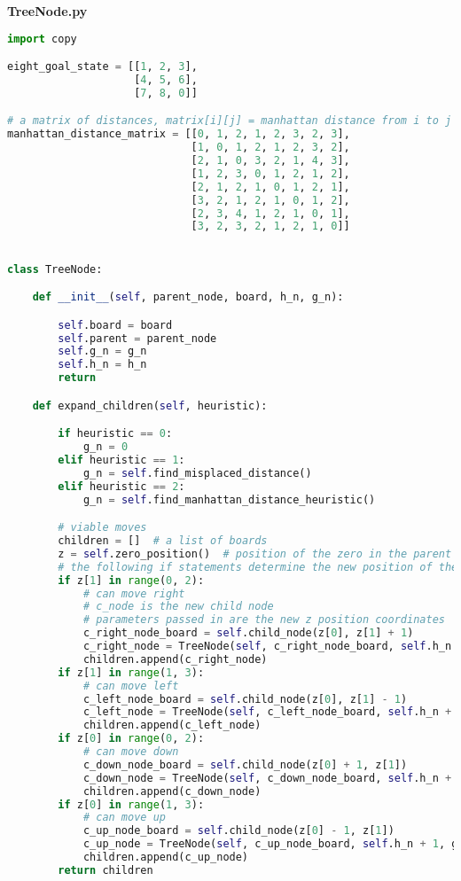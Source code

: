 \documentclass{article}
\begin{document}
\textbf{TreeNode.py}
\begin{lstlisting}[language=python]
import copy

eight_goal_state = [[1, 2, 3],
                    [4, 5, 6],
                    [7, 8, 0]]

# a matrix of distances, matrix[i][j] = manhattan distance from i to j
manhattan_distance_matrix = [[0, 1, 2, 1, 2, 3, 2, 3],
                             [1, 0, 1, 2, 1, 2, 3, 2],
                             [2, 1, 0, 3, 2, 1, 4, 3],
                             [1, 2, 3, 0, 1, 2, 1, 2],
                             [2, 1, 2, 1, 0, 1, 2, 1],
                             [3, 2, 1, 2, 1, 0, 1, 2],
                             [2, 3, 4, 1, 2, 1, 0, 1],
                             [3, 2, 3, 2, 1, 2, 1, 0]]


class TreeNode:

    def __init__(self, parent_node, board, h_n, g_n):

        self.board = board
        self.parent = parent_node
        self.g_n = g_n
        self.h_n = h_n
        return

    def expand_children(self, heuristic):

        if heuristic == 0:
            g_n = 0
        elif heuristic == 1:
            g_n = self.find_misplaced_distance()
        elif heuristic == 2:
            g_n = self.find_manhattan_distance_heuristic()

        # viable moves
        children = []  # a list of boards
        z = self.zero_position()  # position of the zero in the parent
        # the following if statements determine the new position of the 0 in the child node
        if z[1] in range(0, 2):
            # can move right
            # c_node is the new child node
            # parameters passed in are the new z position coordinates
            c_right_node_board = self.child_node(z[0], z[1] + 1)
            c_right_node = TreeNode(self, c_right_node_board, self.h_n + 1, g_n)
            children.append(c_right_node)
        if z[1] in range(1, 3):
            # can move left
            c_left_node_board = self.child_node(z[0], z[1] - 1)
            c_left_node = TreeNode(self, c_left_node_board, self.h_n + 1, g_n)
            children.append(c_left_node)
        if z[0] in range(0, 2):
            # can move down
            c_down_node_board = self.child_node(z[0] + 1, z[1])
            c_down_node = TreeNode(self, c_down_node_board, self.h_n + 1, g_n)
            children.append(c_down_node)
        if z[0] in range(1, 3):
            # can move up
            c_up_node_board = self.child_node(z[0] - 1, z[1])
            c_up_node = TreeNode(self, c_up_node_board, self.h_n + 1, g_n)
            children.append(c_up_node)
        return children


\end{lstlisting}
\end{document}
